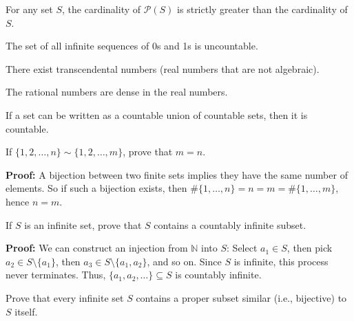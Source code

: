 \begin{theorem}
For any set $S$, the cardinality of $\mathcal{P}(S)$ is strictly greater than the cardinality of $S$.
\end{theorem}

\begin{theorem}
The set of all infinite sequences of 0s and 1s is uncountable.
\end{theorem}

\begin{theorem}
There exist transcendental numbers (real numbers that are not algebraic).
\end{theorem}

\begin{theorem}
The rational numbers are dense in the real numbers.
\end{theorem}

\begin{theorem}
If a set can be written as a countable union of countable sets, then it is countable.
\end{theorem}

\begin{problembox}
If \( \{1, 2, \ldots, n\} \sim \{1, 2, \ldots, m\} \), prove that \( m = n \).
\end{problembox}

\textbf{Proof:}  
A bijection between two finite sets implies they have the same number of elements.  
So if such a bijection exists, then $\#\{1, \ldots, n\} = n = m = \#\{1, \ldots, m\}$, hence $n = m$.

\begin{problembox}
If \( S \) is an infinite set, prove that \( S \) contains a countably infinite subset.
\end{problembox}

\textbf{Proof:}  
We can construct an injection from \( \mathbb{N} \) into \( S \):  
Select \( a_1 \in S \), then pick \( a_2 \in S \setminus \{a_1\} \), then \( a_3 \in S \setminus \{a_1, a_2\} \), and so on.  
Since \( S \) is infinite, this process never terminates. Thus, $\{a_1, a_2, \ldots\} \subseteq S$ is countably infinite.

\begin{problembox}
Prove that every infinite set \( S \) contains a proper subset similar (i.e., bijective) to \( S \) itself.
\end{problembox}


